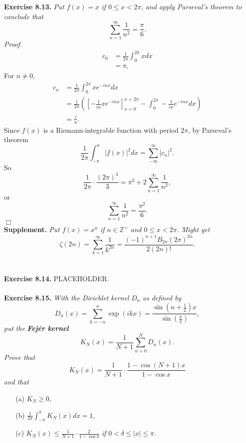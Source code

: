 \documentclass{article}
\begin{document}
\textbf{Exercise 8.13.}
\emph{Put $f(x) = x$ if $0 \leq x < 2 \pi$, and apply Parseval's theorem to conclude that
$$\sum_{n = 1}^{\infty} \frac{1}{n^2} = \frac{\pi}{6}.$$}
\emph{Proof.}
\begin{align*}
c_0
&= \frac{1}{2 \pi} \int_{0}^{2 \pi} x dx \\
&= \pi,
\end{align*}
For $n \neq 0$,
\begin{align*}
c_n
&= \frac{1}{2 \pi} \int_{0}^{2 \pi} x e^{-inx} dx \\
&= \frac{1}{2 \pi} \left(
\left[ - \frac{1}{i n} x e^{-inx} \right]_{x = 0}^{x = 2 \pi}
- \int_{0}^{2 \pi} - \frac{1}{i n} e^{-inx} dx \right) \\
&= \frac{i}{n}.
\end{align*}
Since $f(x)$ is a Riemann-integrable function with period $2 \pi$,
by Parseval's theorem
$$\frac{1}{2 \pi} \int_{-\pi}^\pi |f(x)|^2 dx = \sum_{-\infty}^{\infty} |c_n|^2.$$
So
$$\frac{1}{2 \pi} \cdot \frac{(2 \pi)^3}{3}
= \pi^2 + 2 \sum_{n = 1}^{\infty} \frac{1}{n^2}, $$
or
$$\sum_{n = 1}^{\infty} \frac{1}{n^2}
= \frac{\pi^2}{6}.$$
$\Box$ \\



\textbf{Supplement.} \emph{
Put $f(x) = x^n$ if $n \in \mathbb{Z}^+$ and $0 \leq x < 2 \pi$.
Might get
\[
  \zeta(2n)
  = \sum_{k = 1}^{\infty} \frac{1}{k^{2n}}
  = \frac{(-1)^{n+1} B_{2n} (2\pi)^{2n}}{2(2n)!}.
\]} \\\\






\textbf{Exercise 8.14.}
PLACEHOLDER. \\\\






\textbf{Exercise 8.15.}
\emph{With the Dirichlet kernel $D_n$ as defined by
\[
  D_n(x)
  = \sum_{k=-n}^{n} \exp(ikx)
  = \frac{\sin(n+\frac{1}{2})x}{\sin(\frac{x}{2})},
\]
put the \textbf{Fej\'er kernel}
\[
  K_N(x) = \frac{1}{N+1} \sum_{n=0}^{N} D_n(x).
\]
Prove that
\[
  K_N(x) = \frac{1}{N+1} \cdot \frac{1-\cos(N+1)x}{1-\cos x}
\]
and that}
\begin{enumerate}
  \item[(a)]
  $K_N \geq 0$,

  \item[(b)]
  $\frac{1}{2\pi} \int_{-\pi}^{\pi} K_N(x) dx = 1$,

  \item[(c)]
  \emph{$K_N(x) \leq \frac{1}{N+1} \cdot \frac{2}{1-\cos \delta}$
  if $0 < \delta \leq |x| \leq \pi$.}
\end{enumerate}
\end{document}
